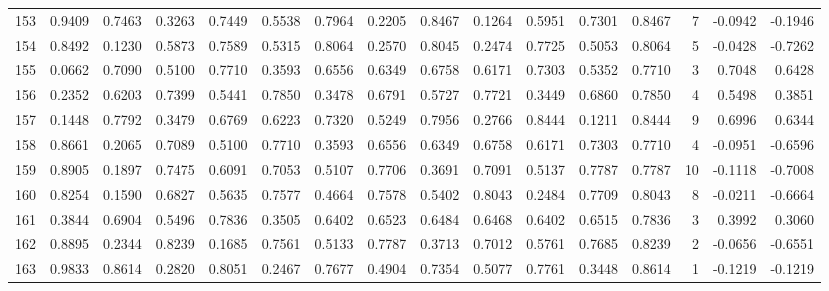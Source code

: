 \begin{tabular}{lrrrrrrrrrrrrrrr}
153 &      0.9409 &  0.7463 &  0.3263 &  0.7449 &  0.5538 &  0.7964 &  0.2205 &  0.8467 &  0.1264 &  0.5951 &   0.7301 &     0.8467 &      7 &                   -0.0942 &                    -0.1946 \\
154 &      0.8492 &  0.1230 &  0.5873 &  0.7589 &  0.5315 &  0.8064 &  0.2570 &  0.8045 &  0.2474 &  0.7725 &   0.5053 &     0.8064 &      5 &                   -0.0428 &                    -0.7262 \\
155 &      0.0662 &  0.7090 &  0.5100 &  0.7710 &  0.3593 &  0.6556 &  0.6349 &  0.6758 &  0.6171 &  0.7303 &   0.5352 &     0.7710 &      3 &                    0.7048 &                     0.6428 \\
156 &      0.2352 &  0.6203 &  0.7399 &  0.5441 &  0.7850 &  0.3478 &  0.6791 &  0.5727 &  0.7721 &  0.3449 &   0.6860 &     0.7850 &      4 &                    0.5498 &                     0.3851 \\
157 &      0.1448 &  0.7792 &  0.3479 &  0.6769 &  0.6223 &  0.7320 &  0.5249 &  0.7956 &  0.2766 &  0.8444 &   0.1211 &     0.8444 &      9 &                    0.6996 &                     0.6344 \\
158 &      0.8661 &  0.2065 &  0.7089 &  0.5100 &  0.7710 &  0.3593 &  0.6556 &  0.6349 &  0.6758 &  0.6171 &   0.7303 &     0.7710 &      4 &                   -0.0951 &                    -0.6596 \\
159 &      0.8905 &  0.1897 &  0.7475 &  0.6091 &  0.7053 &  0.5107 &  0.7706 &  0.3691 &  0.7091 &  0.5137 &   0.7787 &     0.7787 &     10 &                   -0.1118 &                    -0.7008 \\
160 &      0.8254 &  0.1590 &  0.6827 &  0.5635 &  0.7577 &  0.4664 &  0.7578 &  0.5402 &  0.8043 &  0.2484 &   0.7709 &     0.8043 &      8 &                   -0.0211 &                    -0.6664 \\
161 &      0.3844 &  0.6904 &  0.5496 &  0.7836 &  0.3505 &  0.6402 &  0.6523 &  0.6484 &  0.6468 &  0.6402 &   0.6515 &     0.7836 &      3 &                    0.3992 &                     0.3060 \\
162 &      0.8895 &  0.2344 &  0.8239 &  0.1685 &  0.7561 &  0.5133 &  0.7787 &  0.3713 &  0.7012 &  0.5761 &   0.7685 &     0.8239 &      2 &                   -0.0656 &                    -0.6551 \\
163 &      0.9833 &  0.8614 &  0.2820 &  0.8051 &  0.2467 &  0.7677 &  0.4904 &  0.7354 &  0.5077 &  0.7761 &   0.3448 &     0.8614 &      1 &                   -0.1219 &                    -0.1219 \\

\end{tabular}
